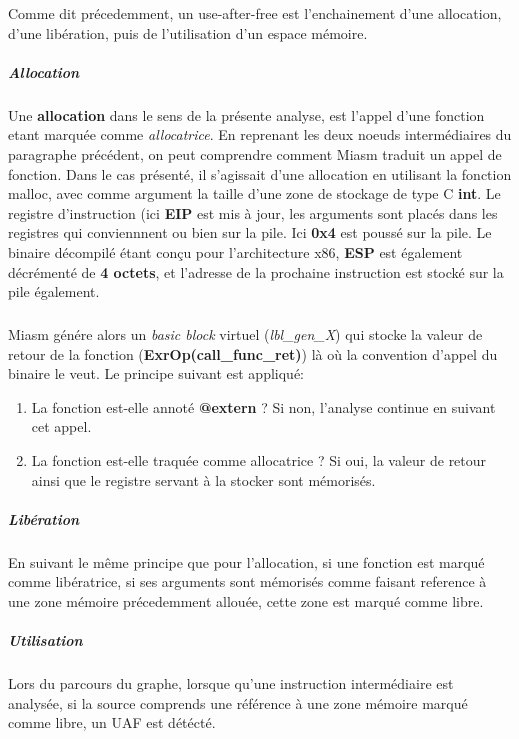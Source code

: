 Comme dit précedemment, un use-after-free est l'enchainement d'une allocation, d'une libération, puis de l'utilisation d'un espace mémoire.
\subparagraph{Allocation}
Une \textbf{allocation} dans le sens de la présente analyse, est l'appel d'une fonction etant marquée comme \textit{allocatrice}. En reprenant les deux noeuds intermédiaires
du paragraphe précédent, on peut comprendre comment Miasm traduit un appel de fonction. Dans le cas présenté, il s'agissait d'une allocation en utilisant la fonction malloc,
avec comme argument la taille d'une zone de stockage de type C \textbf{int}.
Le registre d'instruction (ici \textbf{EIP} est mis à jour, les arguments sont placés dans les registres qui conviennnent ou bien sur la pile.
Ici \textbf{0x4} est poussé sur la pile. Le binaire décompilé étant conçu pour l'architecture x86, \textbf{ESP} est également décrémenté de \textbf{4 octets},
et l'adresse de la prochaine instruction est stocké sur la pile également.
\subparagraph{}
Miasm génére alors un \textit{basic block} virtuel (\textit{lbl\_gen\_X}) qui stocke la valeur de retour de la fonction (\textbf{ExrOp(call\_func\_ret)})
là où la convention d'appel du binaire le veut. Le principe suivant est appliqué:
\begin{enumerate}
    \item La fonction est-elle annoté \textbf{@extern} ? Si non, l'analyse continue en suivant cet appel.
    \item La fonction est-elle traquée comme allocatrice ? Si oui, la valeur de retour ainsi que le registre servant à la stocker sont mémorisés.
\end{enumerate}

\subparagraph{Libération}
En suivant le même principe que pour l'allocation, si une fonction est marqué comme libératrice, si ses arguments sont mémorisés comme faisant reference
à une zone mémoire précedemment allouée, cette zone est marqué comme libre.

\subparagraph{Utilisation}
Lors du parcours du graphe, lorsque qu'une instruction intermédiaire est analysée, si la source comprends une référence à une zone mémoire marqué comme libre,
un UAF est détécté.

